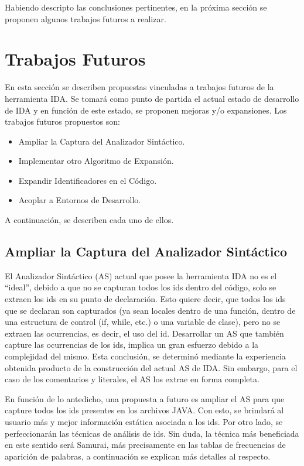 Habiendo descripto las conclusiones pertinentes, en la próxima sección se proponen algunos trabajos futuros a realizar.

\section{Trabajos Futuros}

En esta sección se describen propuestas vinculadas a trabajos futuros de la herramienta IDA. Se tomará como punto de partida el actual estado de desarrollo de IDA y en función de este estado, se proponen mejoras y/o expansiones. Los trabajos futuros propuestos son:

\begin{itemize}

\item Ampliar la Captura del Analizador Sintáctico.

\item Implementar otro Algoritmo de Expansión.

\item Expandir Identificadores en el Código.

\item Acoplar a Entornos de Desarrollo.

\end{itemize}

A continuación, se describen cada uno de ellos.

\subsection{Ampliar la Captura del Analizador Sintáctico}

El Analizador Sintáctico (AS) actual que posee la herramienta IDA no es el “ideal”, debido a que no se capturan todos los ids dentro del código, solo se extraen los ids en su punto de declaración.
Esto quiere decir, que todos los ids que se declaran son capturados (ya sean locales dentro de una función, dentro de una estructura de control (if, while, etc.) o una variable de clase), pero no se extraen las ocurrencias, es decir, el uso del id. 
Desarrollar un AS que también capture las ocurrencias de los ids, implica un gran esfuerzo debido a la complejidad del mismo. Esta conclusión, se determinó mediante la experiencia obtenida producto de la construcción del actual AS de IDA. Sin embargo, para el caso de los comentarios y literales, el AS los extrae en forma completa. 

En función de lo antedicho, una propuesta a futuro es ampliar el AS para que capture todos los ids presentes en los archivos JAVA. Con esto, se brindará al usuario más y mejor información estática asociada a los ids. Por otro lado, se perfeccionarán las técnicas de análisis de ids. 
Sin duda, la técnica más beneficiada en este sentido será Samurai, más precisamente en las tablas de frecuencias de aparición de palabras, a continuación se explican más detalles al respecto.

